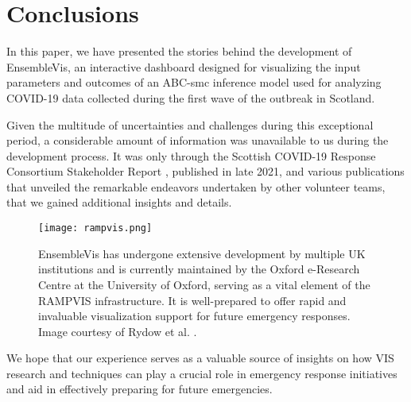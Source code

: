 \section{Conclusions}

In this paper, we have presented the stories behind the development of EnsembleVis, an interactive dashboard designed for visualizing the input parameters and outcomes of an ABC-smc inference model used for analyzing COVID-19 data collected during the first wave of the outbreak in Scotland.

Given the multitude of uncertainties and challenges during this exceptional period, a considerable amount of information was unavailable to us during the development process. It was only through the Scottish COVID-19 Response Consortium Stakeholder Report \cite{abdalla2021Scottish}, published in late 2021, and various publications \cite{chen2022RAMPVIS,dykes2022Visualizationb,khan2022Propagating,rydow2023RAMPVIS} that unveiled the remarkable endeavors undertaken by other volunteer teams, that we gained additional insights and details.

\begin{figure}
    \centering
    \texttt{[image: rampvis.png]}
    \caption{EnsembleVis has undergone extensive development by multiple UK institutions and is currently maintained by the Oxford e-Research Centre at the University of Oxford, serving as a vital element of the RAMPVIS infrastructure. It is well-prepared to offer rapid and invaluable visualization support for future emergency responses. Image courtesy of Rydow et al. \cite{rydow2023RAMPVIS}.
    }
    \label{fig:rampvis}

\end{figure}

We hope that our experience serves as a valuable source of insights on how VIS research and techniques can play a crucial role in emergency response initiatives and aid in effectively preparing for future emergencies.
